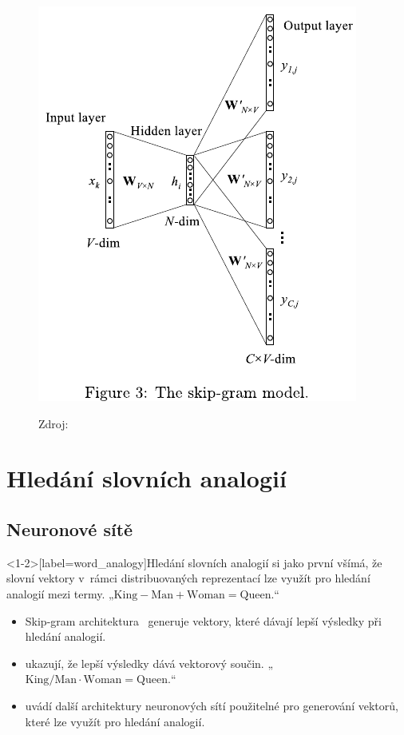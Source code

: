 \begin{frame}
\begin{figure}[H]
\begin{center}
\includegraphics[width=0.3\paperwidth]{figs/rong14_fig3}
\bigskip\par
Zdroj: \textcite[obrázek 3]{rong14}
\end{center}
\end{figure}
\end{frame}


\section{Hledání slovních analogií}
\subsection{Neuronové sítě}

\begin{frame}<1-2>[label=word_analogy]{Hledání slovních analogií}
\textcite{mikolov13c} si jako první všímá, že slovní vektory v~rámci
distribuovaných reprezentací lze využít pro hledání analogií mezi termy.
„$\text{King} - \text{Man} + \text{Woman} = \text{Queen}.$“

\pause

\begin{itemize}[<+->]
\item Skip-gram architektura~\autocites{mikolov13a} generuje vektory, které dávají
  lepší výsledky při hledání analogií.
\item \textcite{levy14c} ukazují, že lepší výsledky dává vektorový součin.
	„$\text{King} / \text{Man} \cdot \text{Woman} = \text{Queen}.$“
\item \textcite[strana 40]{rong15a} uvádí další architektury neuronových sítí
	použitelné pro generování vektorů, které lze využít pro hledání analogií.
\end{itemize}
\end{frame}

